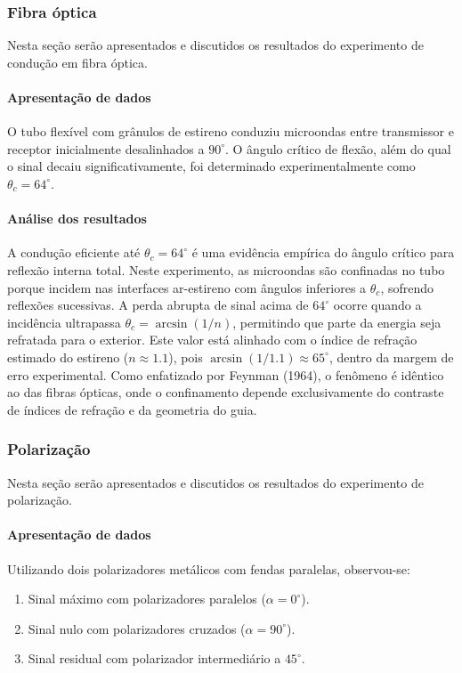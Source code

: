 \documentclass[12pt]{article}
\begin{document}
\subsubsection{Fibra óptica}
Nesta seção serão apresentados e discutidos os resultados do experimento de
condução em fibra óptica.

\paragraph{Apresentação de dados}
O tubo flexível com grânulos de estireno conduziu microondas entre
transmissor e receptor inicialmente desalinhados a \(90^\circ\). O
ângulo crítico de flexão, além do qual o sinal decaiu
significativamente, foi determinado experimentalmente como \(\theta_c
= 64^\circ\).

\paragraph{Análise dos resultados}
A condução eficiente até \(\theta_c = 64^\circ\) é uma evidência
empírica do ângulo crítico para reflexão interna total. Neste
experimento, as microondas são confinadas no tubo porque incidem nas
interfaces ar-estireno com ângulos inferiores a \(\theta_c\),
sofrendo reflexões sucessivas. A perda abrupta de sinal acima de
\(64^\circ\) ocorre quando a incidência ultrapassa \(\theta_c =
\arcsin(1/n)\), permitindo que parte da energia seja refratada para o
exterior. Este valor está alinhado com o índice de refração estimado
do estireno (\(n \approx 1.1\)), pois \(\arcsin(1/1.1) \approx
65^\circ\), dentro da margem de erro experimental. Como enfatizado
por Feynman (1964), o fenômeno é idêntico ao das fibras ópticas, onde
o confinamento depende exclusivamente do contraste de índices de
refração e da geometria do guia.

\subsubsection{Polarização}
Nesta seção serão apresentados e discutidos os resultados do experimento de
polarização.

\paragraph{Apresentação de dados}
Utilizando dois polarizadores metálicos com fendas paralelas, observou-se:
\begin{enumerate}
  \item Sinal máximo com polarizadores paralelos (\(\alpha = 0^\circ\)).
  \item Sinal nulo com polarizadores cruzados (\(\alpha = 90^\circ\)).
  \item Sinal residual com polarizador intermediário a \(45^\circ\).
\end{enumerate}
\end{document}
